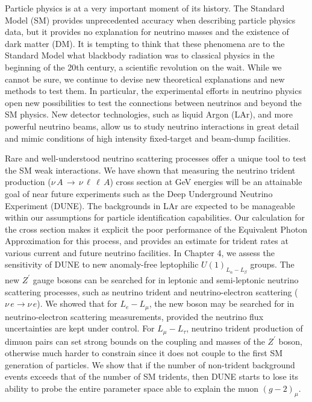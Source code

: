 Particle physics is at a very important moment of its history. The Standard Model (SM) provides unprecedented accuracy when describing particle physics data, but it provides no explanation for neutrino masses and the existence of dark matter (DM). It is tempting to think that these phenomena are to the Standard Model what blackbody radiation was to classical physics in the beginning of the 20th century, a scientific revolution on the wait. While we cannot be sure, we continue to devise new theoretical explanations and new methods to test them. In particular, the experimental efforts in neutrino physics open new possibilities to test the connections between neutrinos and beyond the SM physics. New detector technologies, such as liquid Argon (LAr), and more powerful neutrino beams, allow us to study neutrino interactions in great detail and mimic conditions of high intensity fixed-target and beam-dump facilities. 

Rare and well-understood neutrino scattering processes offer a unique tool to test the SM weak interactions. We have shown that measuring the neutrino trident production ($\nu \, A \, \to \, \nu \, \ell \, \ell \, A$) cross section at GeV energies will be an attainable goal of near future experiments such as the Deep Underground Neutrino Experiment (DUNE). The backgrounds in LAr are expected to be manageable within our assumptions for particle identification capabilities. Our calculation for the cross section makes it explicit the poor performance of the Equivalent Photon Approximation for this process, and provides an estimate for trident rates at various current and future neutrino facilities. In Chapter 4, we assess the sensitivity of DUNE to new anomaly-free leptophilic $U(1)_{L_\alpha - L_\beta}$ groups. The new $Z^\prime$ gauge bosons can be searched for in leptonic and semi-leptonic neutrino scattering processes, such as neutrino trident and neutrino-electron scattering ($\nu \, e \to \nu \, e$). We showed that for $L_e - L_\mu$, the new boson may be searched for in neutrino-electron scattering measurements, provided the neutrino flux uncertainties are kept under control. For $L_\mu - L_\tau$, neutrino trident production of dimuon pairs can set strong bounds on the coupling and masses of the $Z^\prime$ boson, otherwise much harder to constrain since it does not couple to the first SM generation of particles. We show that if the number of non-trident background events exceeds that of the number of SM tridents, then DUNE starts to lose its ability to probe the entire parameter space able to explain the muon $(g-2)_\mu$. 

